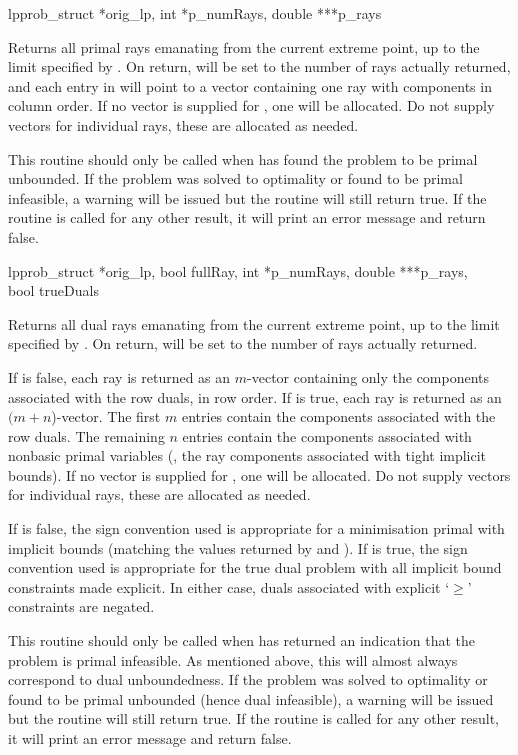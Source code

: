 \begin{subrdoc}
  \item
	  {lpprob_struct *orig_lp, int *p_numRays, double ***p_rays}

  Returns all primal rays emanating from the current extreme point, up to the
  limit specified by .
  On return,  will be set to the number of rays actually
  returned, and each entry in  will point to a vector containing
  one ray with components in column order.
  If no vector is supplied for , one will be allocated.
  Do not supply vectors for individual rays, these are allocated as needed.

  This routine should only be called when \dylp has found the problem to be
  primal unbounded.
  If the problem was solved to optimality or found to be primal infeasible,
  a warning will be issued but the routine will still return true.
  If the routine is called for any other result, it will print an error
  message and return false.

  \item
	  {lpprob_struct *orig_lp, bool fullRay, int *p_numRays,
	   double ***p_rays, \\ bool trueDuals}

  Returns all dual rays emanating from the current extreme point, up to the
  limit specified by .
  On return,  will be set to the number of rays actually
  returned.

  If  is false, each ray is returned as an $m$-vector
  containing only the components associated with the row duals, in row order.
  If  is true, each ray is returned as an $(m+n$)-vector.
  The first $m$ entries contain the components associated
  with the row duals.
  The remaining $n$ entries contain the components associated with nonbasic
  primal variables (\ie, the ray components associated with tight
  implicit bounds).
  If no vector is supplied for , one will be allocated.
  Do not supply vectors for individual rays, these are allocated as needed.

  If  is false, the sign convention used is appropriate for a
  minimisation primal with implicit bounds (matching the values returned by
   and ).
  If  is true, the sign convention used is appropriate for the
  true dual problem with all implicit bound constraints made explicit.
  In either case, duals associated with explicit `$\geq$' constraints are
  negated.

  This routine should only be called when \dylp has returned an indication
  that the problem is primal infeasible.
  As mentioned above, this will almost always correspond to dual unboundedness.
  If the problem was solved to optimality or found to be primal unbounded
  (hence dual infeasible),
  a warning will be issued but the routine will still return true.
  If the routine is called for any other result, it will print an error
  message and return false.
  
\end{subrdoc}



